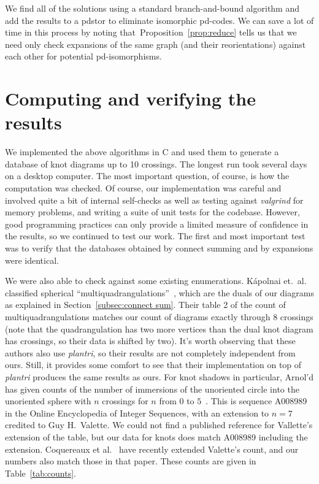\documentclass[amsmath,secnumarabic,floatfix,amssymb,nofootinbib,nobibnotes,letterpaper,11pt,tightenlines,showkeys]{revtex4}
\theoremstyle{definition}
\newcommand{\plantri}{\textit{plantri} }
\newcommand{\valgrind}{\textit{valgrind} }
\begin{document}
We find all of the solutions using a standard branch-and-bound algorithm and add the results to a pdstor to eliminate isomorphic pd-codes. We can save a lot of time in this process by noting that~Proposition~\ref{prop:reduce} tells us that we need only check expansions of the same graph (and their reorientations) against each other for potential pd-isomorphisms. 

\section{Computing and verifying the results}

We implemented the above algorithms in C and used them to generate a database of knot diagrams up to 10 crossings. The longest run took several days on a desktop computer. The most important question, of course, is how the computation was checked. Of course, our implementation was careful and involved quite a bit of internal self-checks as well as testing against \valgrind for memory problems, and writing a suite of unit tests for the codebase. However, good programming practices can only provide a limited measure of confidence in the results, so we continued to test our work. The first and most important test was to verify that the databases obtained by connect summing and by expansions were identical. 

We were also able to check against some existing enumerations. K\'apolnai et.\ al. classified spherical ``multiquadrangulations''~\cite{Kapolnai:2012hs}, which are the duals of our diagrams as explained in Section~\ref{subsec:connect sum}. Their table 2 of the count of multiquadrangulations matches our count of diagrams exactly through $8$ crossings (note that the quadrangulation has two more vertices than the dual knot diagram has crossings, so their data is shifted by two). It's worth observing that these authors also use \emph{plantri}, so their results are not completely independent from ours. Still, it provides some comfort to see that their implementation on top of \plantri produces the same results as ours. For knot shadows in particular, Arnol'd has given counts of the number of immersions of the unoriented circle into the unoriented sphere with $n$ crossings for $n$ from $0$ to $5$~\cite[page 79]{Arnold:1994wr}. This is sequence A008989 in the Online Encyclopedia of Integer Sequences, with an extension to $n=7$ credited to Guy H.\ Valette. We could not find a published reference for Vallette's extension of the table, but our data for knots does match A008989 including the extension.  Coquereaux et al.~\cite{Coquereaux:2015wv} have recently extended Valette's count, and our numbers also match those in that paper. These counts are given in Table~\ref{tab:counts}.
\end{document}
